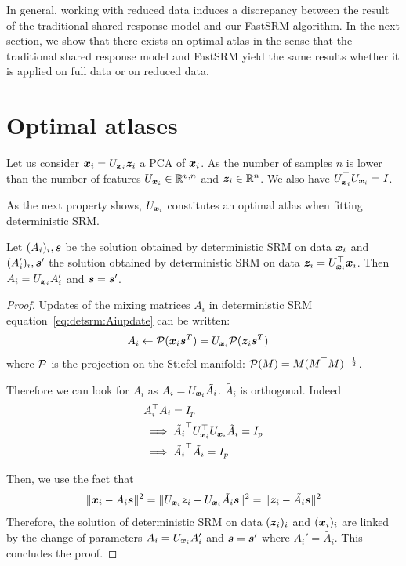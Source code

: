 In general, working with reduced data induces a discrepancy between the result
of the traditional shared response model  and our FastSRM algorithm.
In the next section, we show that there exists an optimal atlas in the sense
that the traditional shared response model and FastSRM yield the same
results whether it is applied on full data or on reduced data.

\section{Optimal atlases}
Let us consider $\boldsymbol{x}_i = U_{\boldsymbol{x}_i} \boldsymbol{z}_i$ a PCA of $\boldsymbol{x}_i$. As the number of
samples $n$ is lower than the number of features $U_{\boldsymbol{x}_i} \in \mathbb{R}^{v, n}$ and
$\boldsymbol{z}_i \in \mathbb{R}^{n}$.  We also have $U_{\boldsymbol{x}_i}^{\top}U_{\boldsymbol{x}_i} = I$.

As the next property shows, $U_{\boldsymbol{x}_i}$ constitutes an optimal atlas when
fitting deterministic SRM.
\begin{prop}
  Let $(A_i)_i, \boldsymbol{s}$ be the solution obtained by deterministic SRM on data
  $\boldsymbol{x}_i$ and $(A_i')_i, \boldsymbol{s}'$ the solution obtained by deterministic SRM on
  data $\boldsymbol{z}_i = U_{\boldsymbol{x}_i}^{\top} \boldsymbol{x}_i$. Then $A_i = U_{\boldsymbol{x}_i}A_i'$ and $\boldsymbol{s} = \boldsymbol{s}'$. 
\label{prop:optimaldetsrm}
\end{prop}
\begin{proof}
Updates of the mixing matrices $A_i$ in deterministic SRM
equation~\eqref{eq:detsrm:Aiupdate} can be written:
\begin{align}
  A_i &\leftarrow \mathcal{P}(\boldsymbol{x}_i \boldsymbol{s}^T)= U_{\boldsymbol{x}_i}\mathcal{P}(\boldsymbol{z}_i \boldsymbol{s}^T)
\end{align}
where $\mathcal{P}$ is the projection on the Stiefel manifold: $\mathcal{P}(M) = M
(M^{\top}M)^{-\frac12}$.


Therefore we can look for $A_i$ as $A_i = U_{\boldsymbol{x}_i} \tilde{A_i}$. $\tilde{A_i}$ is
orthogonal. Indeed
\begin{align}
  &A_i^{\top} A_i = I_p \\
  & \implies \tilde{A_i}^{\top}U_{\boldsymbol{x}_i}^{\top} U_{\boldsymbol{x}_i} \tilde{A_i} = I_p \\
  & \implies \tilde{A_i}^{\top} \tilde{A_i} = I_p
\end{align}

Then, we use the fact that
\begin{align}
  \|\boldsymbol{x}_i - A_i \boldsymbol{s} \|^2 = \| U_{\boldsymbol{x}_i}\boldsymbol{z}_i - U_{\boldsymbol{x}_i}\tilde{A_i} \boldsymbol{s}\|^2 = \| \boldsymbol{z}_i - \tilde{A_i} \boldsymbol{s} \|^2
  \label{eq:equality:xy}
\end{align}
Therefore, the solution of deterministic SRM on data $(\boldsymbol{z}_i)_i$ and
$(\boldsymbol{x}_i)_i$ are linked by the change of parameters $A_i = U_{\boldsymbol{x}_i}A_i'$ and
$\boldsymbol{s} = \boldsymbol{s}'$ where $A_i' = \tilde{A_i}$. This concludes the proof.
\end{proof}
